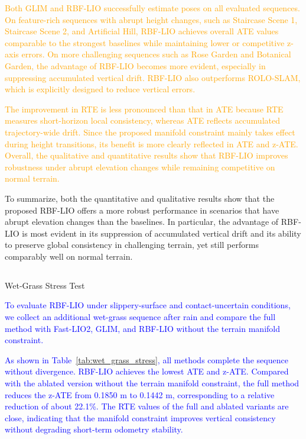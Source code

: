 \documentclass[journal,twoside,web]{ieeecolor}
\makeatletter
\newcommand{\yzl}[1]{\textcolor{orange}{#1}}
\newcommand{\cs}[1]{\textcolor{blue}{#1}}
\let\origsubsection\subsection
\def\subsection{\@ifstar\subsectionstarcolor\subsectioncolorcmd}
\def\subsectioncolorcmd#1{\origsubsection{\textcolor{subsectioncolor}{#1}}}
\def\subsectionstarcolor#1{\origsubsection*{#1}}
\makeatother
\begin{document}
\yzl{Both GLIM and RBF-LIO successfully estimate poses on all evaluated sequences. On feature-rich sequences with abrupt height changes, such as Staircase Scene 1, Staircase Scene 2, and Artificial Hill, RBF-LIO achieves overall ATE values comparable to the strongest baselines while maintaining lower or competitive z-axis errors. On more challenging sequences such as Rose Garden and Botanical Garden, the advantage of RBF-LIO becomes more evident, especially in suppressing accumulated vertical drift. RBF-LIO also outperforms ROLO-SLAM, which is explicitly designed to reduce vertical errors.}

\yzl{The improvement in RTE is less pronounced than that in ATE because RTE measures short-horizon local consistency, whereas ATE reflects accumulated trajectory-wide drift. Since the proposed manifold constraint mainly takes effect during height transitions, its benefit is more clearly reflected in ATE and z-ATE. Overall, the qualitative and quantitative results show that RBF-LIO improves robustness under abrupt elevation changes while remaining competitive on normal terrain.}

To summarize, both the quantitative and qualitative results show that the proposed RBF-LIO offers a more robust performance in scenarios that have abrupt elevation changes than the baselines. In particular, the advantage of RBF-LIO is most evident in its suppression of accumulated vertical drift and its ability to preserve global consistency in challenging terrain, yet still performs comparably well on normal terrain.

\subsection{Wet-Grass Stress Test}
\label{subsec:wet_grass_stress}

\cs{To evaluate RBF-LIO under slippery-surface and contact-uncertain conditions, we collect an additional wet-grass sequence after rain and compare the full method with Fast-LIO2, GLIM, and RBF-LIO without the terrain manifold constraint.}


\cs{As shown in Table~\ref{tab:wet_grass_stress}, all methods complete the sequence without divergence. RBF-LIO achieves the lowest ATE and z-ATE. Compared with the ablated version without the terrain manifold constraint, the full method reduces the z-ATE from 0.1850 m to 0.1442 m, corresponding to a relative reduction of about 22.1\%. The RTE values of the full and ablated variants are close, indicating that the manifold constraint improves vertical consistency without degrading short-term odometry stability.}
\end{document}
